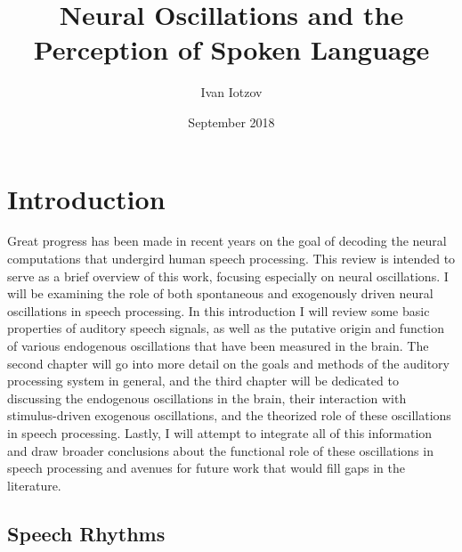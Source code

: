 \documentclass[titlepage]{article}
\title{Neural Oscillations and the \\ Perception of Spoken Language}
\author{Ivan Iotzov}
\date{September 2018}
\begin{document}

\maketitle


\section{Introduction} \label{intro}

  Great progress has been made in recent years on the goal
  of decoding the neural computations that undergird 
  human speech processing. This review is intended
  to serve as a brief overview of this work, focusing especially on 
  neural oscillations. I will be examining the role of
  both spontaneous and exogenously driven neural oscillations 
  in speech processing. In this introduction I will review
  some basic properties of auditory speech signals, as well as the putative 
  origin and function of various endogenous oscillations that have been 
  measured in the brain. The second 
  chapter will go into more detail on the goals and methods of the auditory 
  processing system in general, and the third chapter will be dedicated to 
  discussing the endogenous oscillations in the brain, their interaction with 
  stimulus-driven exogenous oscillations, and the theorized role of these 
  oscillations in speech processing. Lastly, I will attempt
  to integrate all of this information and draw broader conclusions about 
  the functional role of these oscillations in speech processing and avenues 
  for future work that would fill gaps in the literature.


  \subsection{Speech Rhythms}
\end{document}

